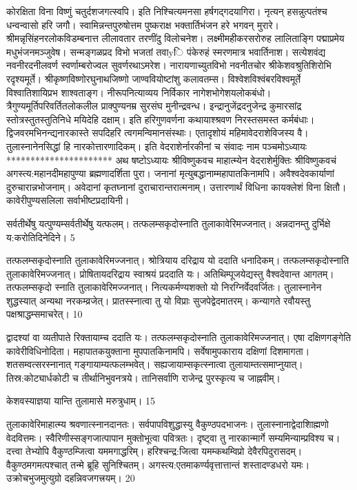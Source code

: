 कोरक्षिता विना विष्णुं चतुर्दशजगत्स्वपि।
इति निश्चित्यमनसा हर्षगद्गदयागिरा।
नृत्यन् हसन्नुत्पतंश्च धन्वन्वासो हरि जगौ।
स्वामिन्नन्तपुरुषोत्तम पुष्कराक्ष
भक्तार्तिभंजन हरे भगवन् मुरारे।
श्रीमन्नृसिंहनरलोकविडम्बनात्त
लीलावतार तरणींदु विलोचनेश।
लक्ष्मीमहीकरसरोरुह लालिताङ्गि
पद्माप्रमेय मधुभंजनमञ्जुवेष।
सन्मङ्गळप्रद विभो भजतां तवाyि
पंकेरुहं स्मरणमात्र भवार्तिनाश।
सत्येशवंद्य नवनीरदनीलवर्ण
स्वर्णाम्बरोज्वल सुवर्णरथाऽमरेश।
नारायणाच्युतविभो नवनीतचोर
श्रीकेशवश्रुतिशिरोभि रदृश्यमूर्ते।
श्रीकृष्णविष्णोरघुनाथजिष्णो
जाण्ववियोष्टांशु कलावतम्स।
विश्वेशविश्वंबरविश्वमूर्ते
विश्वातिशायिप्रभ शाश्वताङ्ग।
नीरूपनित्याव्यय निर्विकार
नागेशभोगेशयलोकबंधो।
त्रैगुण्यमूर्तिपरिवर्तितलोकलील
प्राक्पुण्यनम्र सुरसंघ मुनीन्द्रवन्ध।
इन्द्रानुजेंद्रदनुजेन्द्र कुमारसांद्र
स्तोत्रस्तुतस्तुतिनिधे मयिदेहि दक्षाम्।
इति हरिगुणवर्णना कथायाश्श्रवण
निरस्तसमस्त कर्मबंधाः।
द्विजवरमभिनन्द्यनारकास्ते
सपदिहरि त्वगमन्विमानसंस्थाः।
एतादृशोयं महिमावेदराशेविजस्य वै।
तुलास्नानेनसिद्धां हि नारकोत्तारणादिकम्।
इति वेदराशेर्नारकीनां च संवादः नाम
पञ्चमोऽध्यायः
**********************
अथ षष्टोऽध्यायः श्रीविष्णुकवच माहात्म्येन वेदराशेर्मुक्तिः
श्रीविष्णुकवचं अगस्त्य:महानदीमहापुण्या ब्रह्मणादर्शिता पुरा।
जनानां मृत्युबद्धानाम्महापातकिनामपि।
अवैश्वदेवकार्याणां दुरुचारान्नभोजनाम्।
अवेदानां कृतघ्नानां दुराचारान्तरात्मनाम्।
उत्तारणार्थं विधिना कायक्लेशं विना क्षितौ।
कावेरीपुण्यसलिला सर्वाभीष्टप्रदायिनी।

सर्वतीर्थेषु यत्पुण्यम्सर्वतीर्थेषु यत्फलम्।
तत्फलम्सकृदोस्नाति तुलाकावेरिमज्जनात्।
अन्नदानम्तु दुर्भिक्षे य:करोतिदिनेदिने।
5

तत्फलम्सकृदोस्नाति तुलाकावेरिमज्जनात्।
श्रोत्रियाय दरिद्राय यो ददाति धनादिकम्।
तत्फलम्सकृदोस्नाति तुलाकावेरिमज्जनात्।
प्रोषितायदरिद्राय स्वाश्रयं प्रददाति यः।
अतिथिम्पूजयेद्यस्तु वैश्वदेवान्त आगतम्।
तत्फलम्सकृदो स्नाति तुलाकावेरिमज्जनात्।
नित्यकर्मण्यशक्तो यो निरग्निर्वेदवर्जितः।
तुलास्नानेन शुद्धस्यात् अन्यथा नरकम्व्रजेत्।
प्रातस्स्नात्वा तु यो विप्राः सुजपेद्वेदमातरम्।
कन्यागते रवौयस्तु पक्षश्राद्धम्समाचरेत्।
10

द्वादश्यां वा व्यतीपाते रिक्तायाम्च ददाति यः।
तत्फलम्सकृदोस्नाति तुलाकावेरिमज्जनात्।
एषा दक्षिणगङ्गेति कावेरीविधिनोदिता।
महापातकयुक्ताना मुपपातकिनामपि।
सर्वेषामुपकाराय दक्षिणां दिशमागता।
शतसम्वत्सरस्नानात् गङ्गायाम्यत्फलम्भवेत्।
सह्यजायाम्सकृत्स्नात्वा तुलायाम्तत्समाप्नुयात्।
तिस्र:कोट्यार्धकोटी च तीर्थानिभुवनत्रये।
तानिसर्वाणि राजेन्द्र पुरस्कृत्य च जाह्नवीम्।

केशवस्याज्ञया यान्ति तुलामासे मरुत्रुधाम्।
15

तुलाकावेरिमाहात्म्य श्रवणात्स्नानदानतः।
सर्वपापविशुद्धास्यु वैकुण्ठपदभाजनः।
तुलास्नानाद्वेदाशिाह्मणो वेदवित्तमः।
स्वैरिणीस्सङ्गजात्पापान मुक्तोभूत्वा पवित्रतः।
दृष्ट्वा तु नारकान्मार्गे सम्यमिन्याम्प्रविश्य च।
दत्त्वा तेभ्योपि वैकुण्ठम्जित्वा यममगाद्धरिम्।
हरिश्चन्द्र:जित्वा यमम्कथम्विप्रो देवैरपिदुरासदम्।
वैकुण्ठमगमत्पश्चात् तन्मे ब्रूहि सुनिश्चितम्।
अगस्त्य:एतमाकर्ण्यवृत्तात्तान्तं शस्तादण्डधरो यमः।
उक्रोचभुजमुत्युग्रो दहन्निवजगत्त्रयम्।
20

